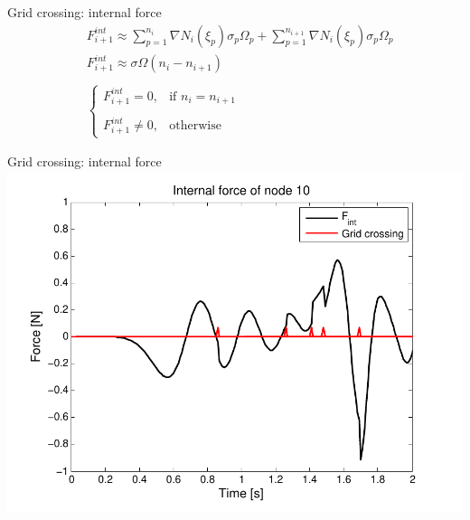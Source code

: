 \documentclass[mathserif,professionalfont,hyperref={pdfpagelabels=false}]{beamer}
\begin{document}
\begin{frame}{Grid crossing: internal force}
 \begin{align}\nonumber
  & F^{int}_{i+1} \approx \sum_{p=1}^{n_i} \nabla N_i(\xi_p)\sigma_p \Omega_p + \sum_{p=1}^{n_{i+1}}\nabla N_i(\xi_p) \sigma_p \Omega_p\\ \nonumber
  & F^{int}_{i+1} \approx \sigma \Omega (n_i - n_{i+1})\\ \nonumber
  & \: \\ \nonumber
  & \begin{cases}F^{int}_{i+1} = 0, &\mbox{if } n_{i} = n_{i+1} \\
\: \\
F^{int}_{i+1} \neq 0, & \mbox{otherwise} \end{cases}  
 \end{align}
\end{frame}

\begin{frame}{Grid crossing: internal force}
\centering
\includegraphics[width=0.7\paperwidth,height=0.7\paperheight]{images/Grid_crossing}
\end{frame}
\end{document}

